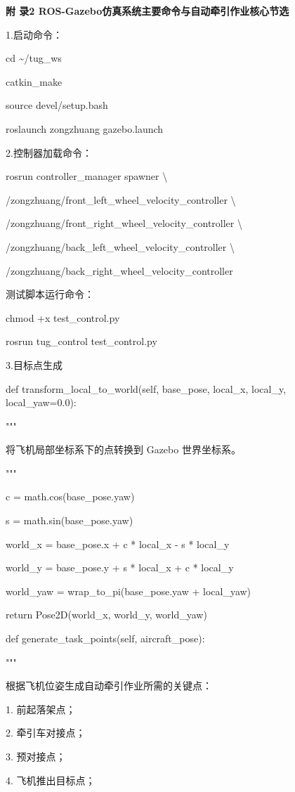 \textbf{附 录2
ROS-Gazebo仿真系统主要命令与自动牵引作业核心节选}

1.启动命令：

cd \textasciitilde/tug\_ws

catkin\_make

source devel/setup.bash

roslaunch zongzhuang gazebo.launch

2.控制器加载命令：

rosrun controller\_manager spawner \textbackslash{}

/zongzhuang/front\_left\_wheel\_velocity\_controller \textbackslash{}

/zongzhuang/front\_right\_wheel\_velocity\_controller \textbackslash{}

/zongzhuang/back\_left\_wheel\_velocity\_controller \textbackslash{}

/zongzhuang/back\_right\_wheel\_velocity\_controller

测试脚本运行命令：

chmod +x test\_control.py

rosrun tug\_control test\_control.py

3.目标点生成

    def transform\_local\_to\_world(self, base\_pose, local\_x, local\_y, local\_yaw=0.0):

        """

        将飞机局部坐标系下的点转换到 Gazebo 世界坐标系。

        """

        c = math.cos(base\_pose.yaw)

        s = math.sin(base\_pose.yaw)

        world\_x = base\_pose.x + c * local\_x - s * local\_y

        world\_y = base\_pose.y + s * local\_x + c * local\_y

        world\_yaw = wrap\_to\_pi(base\_pose.yaw + local\_yaw)

        return Pose2D(world\_x, world\_y, world\_yaw)

    def generate\_task\_points(self, aircraft\_pose):

        """

        根据飞机位姿生成自动牵引作业所需的关键点：

        1. 前起落架点；

        2. 牵引车对接点；

        3. 预对接点；

        4. 飞机推出目标点；

